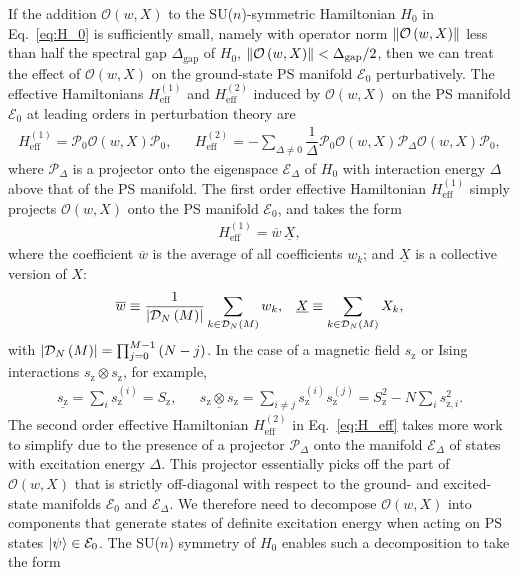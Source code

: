 \documentclass[nofootinbib,twocolumn]{revtex4-2}
\renewcommand{\t}{\text} %
\newcommand{\f}[2]{\dfrac{#1}{#2}} %
\newcommand{\p}[1]{\left(#1\right)} %
\newcommand{\1}{\mathds{1}}
\newcommand{\z}{\text{z}}
\newcommand{\D}{\mathcal{D}}
\newcommand{\E}{\mathcal{E}}
\renewcommand{\O}{\mathcal{O}}
\renewcommand{\P}{\mathcal{P}}
\newcommand{\eff}{\text{eff}}
\newcommand{\col}{\underline}
\newcommand{\mean}{\overline}
\begin{document}
If the addition $\O\p{w,X}$ to the SU($n$)-symmetric Hamiltonian $H_0$ in Eq.~\eqref{eq:H_0} is sufficiently small, namely with operator norm $\norm{\O\p{w,X}}$ less than half the spectral gap $\Delta_{\t{gap}}$ of $H_0$, $\norm{\O\p{w,X}}<\Delta_{\t{gap}}/2$, then we can treat the effect of $\O\p{w,X}$ on the ground-state PS manifold $\E_0$ perturbatively.
The effective Hamiltonians $H_\eff^{(1)}$ and $H_\eff^{(2)}$ induced by $\O\p{w,X}$ on the PS manifold $\E_0$ at leading orders in perturbation theory are \cite{bravyi2011schrieffer}
\begin{align}
  H_\eff^{(1)} = \P_0 \O\p{w,X} \P_0,
  &&
  H_\eff^{(2)} = - \sum_{\Delta\ne0}
  \f1\Delta \P_0 \O\p{w,X} \P_\Delta \O\p{w,X} \P_0,
  \label{eq:H_eff}
\end{align}
where $\P_\Delta$ is a projector onto the eigenspace $\E_\Delta$ of $H_0$ with interaction energy $\Delta$ above that of the PS manifold.
The first order effective Hamiltonian $H_\eff^{(1)}$ simply projects $\O\p{w,X}$ onto the PS manifold $\E_0$, and takes the form
\begin{align}
  H_\eff^{(1)} = \mean w \, \col X,
  \label{eq:H_eff_1}
\end{align}
where the coefficient $\mean w$ is the average of all coefficients $w_k$; and $\col X$ is a collective version of $X$:
\begin{align}
  \mean w \equiv \f1{\abs{\D_N\p{M}}}
  \sum_{k\in\D_N\p{M}} w_k,
  &&
  \col X \equiv \sum_{k\in\D_N\p{M}} X_k,
  \label{eq:mean_col}
\end{align}
with $\abs{\D_N\p{M}}=\prod_{j=0}^{M-1}\p{N-j}$.
In the case of a magnetic field $s_\z$ or Ising interactions  $s_\z\otimes s_\z$, for example,
\begin{align}
  \col{s_\z} = \sum_i s_\z^{(i)} = S_\z,
  &&
  \col{s_\z\otimes s_\z}
  = \sum_{i\ne j} s_\z^{(i)} s_\z^{(j)}
  = S_\z^2 - N \sum_i s_{\z,i}^2.
\end{align}
The second order effective Hamiltonian $H_\eff^{(2)}$ in Eq.~\eqref{eq:H_eff} takes more work to simplify due to the presence of a projector $\P_\Delta$ onto the manifold $\E_\Delta$ of states with excitation energy $\Delta$.
This projector essentially picks off the part of $\O\p{w,X}$ that is strictly off-diagonal with respect to the ground- and excited-state manifolds $\E_0$ and $\E_\Delta$.
We therefore need to decompose $\O\p{w,X}$ into components that generate states of definite excitation energy when acting on PS states $\ket\psi\in\E_0$.
The SU($n$) symmetry of $H_0$ enables such a decomposition to take the form
\end{document}
